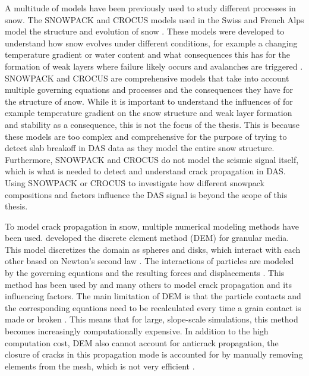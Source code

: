 A multitude of models have been previously used to study different processes in snow. The SNOWPACK and CROCUS models used in the Swiss and French Alps model the structure and evolution of snow \parencite{brunNumericalModelSimulate1992,barteltPhysicalSNOWPACKModel2002}. These models were developed to understand how snow evolves under different conditions, for example a changing temperature gradient or water content and what consequences this has for the formation of weak layers where failure likely occurs and avalanches are triggered \parencite{brunNumericalModelSimulate1992,barteltPhysicalSNOWPACKModel2002}. SNOWPACK and CROCUS are comprehensive models that take into account multiple governing equations and processes and the consequences they have for the structure of snow. While it is important to understand the influences of for example temperature gradient on the snow structure and weak layer formation and stability as a consequence, this is not the focus of the thesis. This is because these models are too complex and comprehensive for the purpose of trying to detect slab breakoff in DAS data as they model the entire snow structure. Furthermore, SNOWPACK and CROCUS do not model the seismic signal itself, which is what is needed to detect and understand crack propagation in DAS. Using SNOWPACK or CROCUS to investigate how different snowpack compositions and factors influence the DAS signal is beyond the scope of this thesis. \par

To model crack propagation in snow, multiple numerical modeling methods have been used. \cite{cundallDiscreteNumericalModel1979} developed the discrete element method  (DEM) for granular media. This model discretizes the domain as spheres and disks, which interact with each other based on Newton's second law \parencite{cundallDiscreteNumericalModel1979}. The interactions of particles are modeled by the governing equations and the resulting forces and displacements \parencite{cundallDiscreteNumericalModel1979}. This method has been used by \cite{bobillierMicromechanicalModelingSnow2020,bobillierNumericalInvestigationCrack2024,mulakNumericalInvestigationMixedmode2019} and many others to model crack propagation and its influencing factors. The main limitation of DEM is that the particle contacts and the corresponding equations need to be recalculated every time a grain contact is made or broken \parencite{cundallDiscreteNumericalModel1979}. This means that for large, slope-scale simulations, this method becomes increasingly computationally expensive. In addition to the high computation cost, DEM also cannot account for anticrack propagation, the closure of cracks in this propagation mode is accounted for by manually removing elements from the mesh, which is not very efficient \parencite{gaumeInvestigatingReleaseFlow2019}. \par

